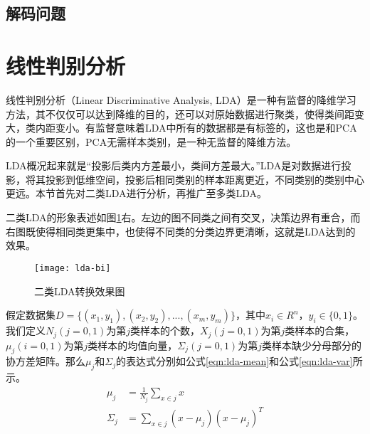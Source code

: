 \subsection{解码问题}


\section{线性判别分析}
线性判别分析（Linear Discriminative Analysis, LDA）是一种有监督的降维学习方法，其不仅仅可以达到降维的目的，还可以对原始数据进行聚类，使得类间距变大，类内距变小。有监督意味着LDA中所有的数据都是有标签的，这也是和PCA的一个重要区别，PCA无需样本类别，是一种无监督的降维方法。

LDA概况起来就是“投影后类内方差最小，类间方差最大。”LDA是对数据进行投影，将其投影到低维空间，投影后相同类别的样本距离更近，不同类别的类别中心更远。本节首先对二类LDA进行分析，再推广至多类LDA。

二类LDA的形象表述如图\ref{fig:lda-bi}右。左边的图不同类之间有交叉，决策边界有重合，而右图既使得相同类更集中，也使得不同类的分类边界更清晰，这就是LDA达到的效果。
\begin{figure}[htbp]
  \centering
  \texttt{[image: lda-bi]}
  \caption{二类LDA转换效果图 \label{fig:lda-bi}}
\end{figure}

假定数据集$D=\{(x_1, y_1), (x_2, y_2), ..., (x_m, y_m)\}$，其中$x_i \in R^{n}$，$y_i \in \{0, 1\}$。我们定义$N_j (j=0,1)$为第$j$类样本的个数，$X_j (j=0,1)$为第$j$类样本的合集，$\mu_j (i=0,1)$为第$j$类样本的均值向量，$\Sigma_j (j=0,1)$为第$j$类样本缺少分母部分的协方差矩阵。那么$\mu_j$和$\Sigma_j$的表达式分别如公式\ref{eqn:lda-mean}和公式\ref{eqn:lda-var}所示。
\begin{align}
\mu_j &= \frac{1}{N_j} \sum_{x\in{j}} x  \label{eqn:lda-mean}\\
\Sigma_j &= \sum_{x\in{j}} (x-\mu_{j})(x-\mu_{j})^{T} \label{eqn:lda-var}
\end{align}

